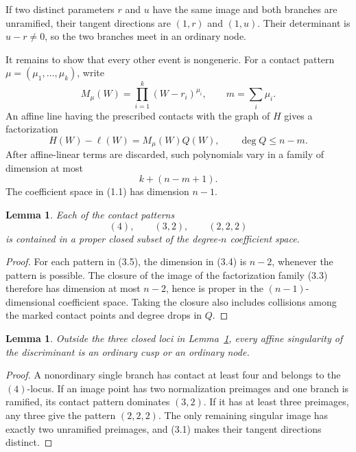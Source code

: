 \documentclass[11pt]{article}
\newtheorem{lemma}[theorem]{Lemma}
\begin{document}
If two distinct parameters \(r\) and \(u\) have the same image and both
branches are unramified, their tangent directions are \((1,r)\) and
\((1,u)\).  Their determinant is \(u-r\neq0\), so the two branches meet in
an ordinary node.

It remains to show that every other event is nongeneric.  For a contact
pattern \(\mu=(\mu_1,\ldots,\mu_k)\), write
\[
  M_\mu(W)=\prod_{i=1}^k(W-r_i)^{\mu_i},\qquad
  m=\sum_i\mu_i.
\]
An affine line having the prescribed contacts with the graph of \(H\)
gives a factorization
\[
  H(W)-\ell(W)=M_\mu(W)Q(W),\qquad \deg Q\leq n-m.        \tag{3.3}
\]
After affine-linear terms are discarded, such polynomials vary in a family
of dimension at most
\[
  k+(n-m+1).                                             \tag{3.4}
\]
The coefficient space in (1.1) has dimension \(n-1\).

\begin{lemma}\label{lem:bad}
Each of the contact patterns
\[
  (4),\qquad(3,2),\qquad(2,2,2)                          \tag{3.5}
\]
is contained in a proper closed subset of the degree-\(n\) coefficient
space.
\end{lemma}

\begin{proof}
For each pattern in (3.5), the dimension in (3.4) is \(n-2\), whenever the
pattern is possible.  The closure of the image of the factorization family
(3.3) therefore has dimension at most \(n-2\), hence is proper in the
\((n-1)\)-dimensional coefficient space.  Taking the closure also includes
collisions among the marked contact points and degree drops in \(Q\).
\end{proof}

\begin{lemma}\label{lem:exhaustion}
Outside the three closed loci in Lemma~\ref{lem:bad}, every affine
singularity of the discriminant is an ordinary cusp or an ordinary node.
\end{lemma}

\begin{proof}
A nonordinary single branch has contact at least four and belongs to the
\((4)\)-locus.  If an image point has two normalization preimages and one
branch is ramified, its contact pattern dominates \((3,2)\).  If it has at
least three preimages, any three give the pattern \((2,2,2)\).  The only
remaining singular image has exactly two unramified preimages, and (3.1)
makes their tangent directions distinct.
\end{proof}
\end{document}

